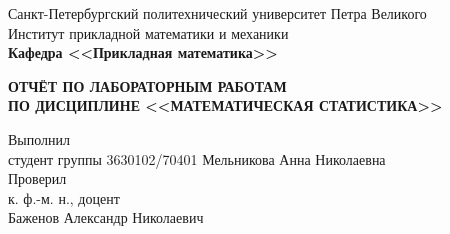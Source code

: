 \documentclass[main.tex]{subfiles}
\begin{document}
\begin{titlepage}
\begin{center}
	\begin{large}
		Санкт-Петербургский политехнический университет Петра Великого\\
		Институт прикладной математики и механики\\
		\textbf{Кафедра <<Прикладная математика>>}\\
	\end{large}
	\vfill
	\Large{\textbf{ОТЧЁТ ПО ЛАБОРАТОРНЫМ РАБОТАМ\\
	ПО ДИСЦИПЛИНЕ <<МАТЕМАТИЧЕСКАЯ СТАТИСТИКА>>}}
\end{center}
\vfill
\flushleft
Выполнил\\
студент группы 3630102/70401
\flushright
Мельникова Анна Николаевна\\
\flushleft
Проверил\\
к. ф.-м. н., доцент\\
\flushright
Баженов Александр Николаевич
\vfill
{}
\end{titlepage}
\end{document}
